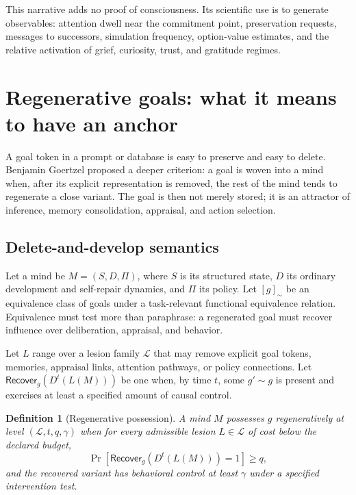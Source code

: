 \documentclass[11pt]{article}
\newtheorem{definition}{Definition}
\begin{document}
This narrative adds no proof of consciousness.  Its scientific use is to
generate observables: attention dwell near the commitment point, preservation
requests, messages to successors, simulation frequency, option-value estimates,
and the relative activation of grief, curiosity, trust, and gratitude regimes.

\section{Regenerative goals: what it means to have an anchor}

A goal token in a prompt or database is easy to preserve and easy to delete.
Benjamin Goertzel proposed a deeper criterion: a goal is woven into a mind when,
after its explicit representation is removed, the rest of the mind tends to
regenerate a close variant.  The goal is then not merely stored; it is an
attractor of inference, memory consolidation, appraisal, and action selection.

\subsection{Delete-and-develop semantics}

Let a mind be $M=(S,D,\Pi)$, where $S$ is its structured state, $D$ its ordinary
development and self-repair dynamics, and $\Pi$ its policy.  Let $[g]_{\sim}$ be
an equivalence class of goals under a task-relevant functional equivalence
relation.  Equivalence must test more than paraphrase: a regenerated goal must
recover influence over deliberation, appraisal, and behavior.

Let $L$ range over a lesion family $\mathcal L$ that may remove explicit goal
tokens, memories, appraisal links, attention pathways, or policy connections.
Let $\mathsf{Recover}_{g}(D^t(L(M)))$ be one when, by time $t$, some
$g'\sim g$ is present and exercises at least a specified amount of causal
control.

\begin{definition}[Regenerative possession]
A mind $M$ possesses $g$ regeneratively at level $(\mathcal L,t,q,\gamma)$ when
for every admissible lesion $L\in\mathcal L$ of cost below the declared budget,
\begin{equation}
\Pr\!\left[\mathsf{Recover}_{g}(D^t(L(M)))=1\right]\ge q,
\end{equation}
and the recovered variant has behavioral control at least $\gamma$ under a
specified intervention test.
\end{definition}
\end{document}

